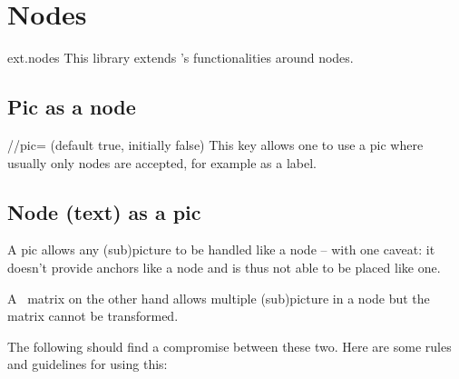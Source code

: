 %
%
%

\section{Nodes}
\begin{tikzlibrary}{ext.nodes}
This library extends \tikzname's functionalities around nodes.
\end{tikzlibrary}

\begin{multicols}{2}
\subsection{Pic as a node}
\begin{key}{/\tikzext/pic= (default true, initially false)}
This key allows one to use a pic where usually only nodes are accepted,
for example as a label.
\begin{codeexample}[preamble=\usetikzlibrary{ext.nodes}]
\begin{tikzpicture}[
  slsl/.pic={\draw(-2pt, 1.5pt)--( 2pt, .5pt)
                  ( 2pt,-1.5pt)--(-2pt,-.5pt);}]
\node[
  draw, minimum width=3cm, minimum height=1cm,
  label={[ext/pic            ] east:slsl},
  label={[ext/pic, rotate= 90]north:slsl},
  label={[ext/pic            ] west:slsl},
  label={[ext/pic, rotate=-90]south:slsl}]{};
\end{tikzpicture}
\end{codeexample}
\end{key}
\newcolumn

\subsection{Node (text) as a pic}
A pic allows any (sub)picture to be handled like a node --
with one caveat: it doesn't provide anchors like a node and
is thus not able to be placed like one.

A \pgfname\ matrix on the other hand allows multiple (sub)picture in a node
but the matrix cannot be transformed.

The following should find a compromise between these two.
Here are some rules and guidelines for using this:


\end{multicols}
